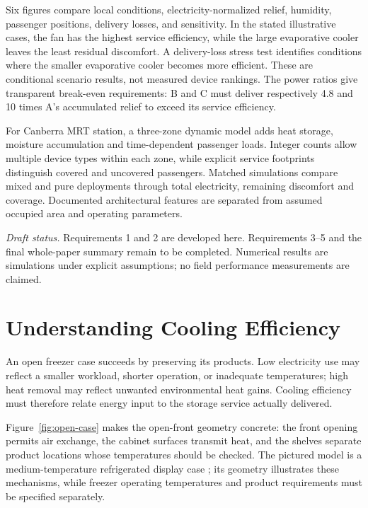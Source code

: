 \documentclass[12pt]{article}
\begin{document}
Six figures compare local conditions, electricity-normalized relief, humidity, passenger positions, delivery losses, and sensitivity. In the stated illustrative cases, the fan has the highest service efficiency, while the large evaporative cooler leaves the least residual discomfort. A delivery-loss stress test identifies conditions where the smaller evaporative cooler becomes more efficient. These are conditional scenario results, not measured device rankings. The power ratios give transparent break-even requirements: B and C must deliver respectively 4.8 and 10 times A's accumulated relief to exceed its service efficiency.

For Canberra MRT station, a three-zone dynamic model adds heat storage, moisture accumulation and time-dependent passenger loads. Integer counts allow multiple device types within each zone, while explicit service footprints distinguish covered and uncovered passengers. Matched simulations compare mixed and pure deployments through total electricity, remaining discomfort and coverage. Documented architectural features are separated from assumed occupied area and operating parameters.

\medskip
\noindent\textit{Draft status.} Requirements 1 and 2 are developed here. Requirements 3--5 and the final whole-paper summary remain to be completed. Numerical results are simulations under explicit assumptions; no field performance measurements are claimed.

\clearpage
\pagestyle{fancy}
\tableofcontents
\clearpage

\section{Understanding Cooling Efficiency}
\label{sec:understand}

An open freezer case succeeds by preserving its products. Low electricity use may reflect a smaller workload, shorter operation, or inadequate temperatures; high heat removal may reflect unwanted environmental heat gains. Cooling efficiency must therefore relate energy input to the storage service actually delivered.


Figure~\ref{fig:open-case} makes the open-front geometry concrete: the front opening permits air exchange, the cabinet surfaces transmit heat, and the shelves separate product locations whose temperatures should be checked. The pictured model is a medium-temperature refrigerated display case \cite{hillphoenix}; its geometry illustrates these mechanisms, while freezer operating temperatures and product requirements must be specified separately.
\end{document}
